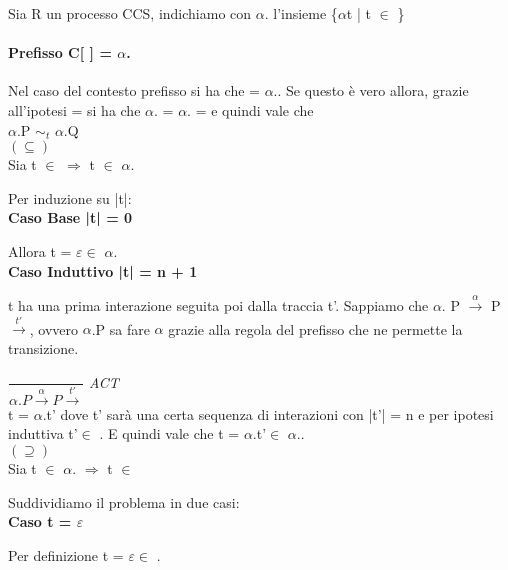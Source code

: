 Sia R un processo CCS, indichiamo con $\alpha$. l'insieme \{$\alpha$t | t $\in$ \}

\paragraph{Prefisso C[ ] = $\alpha$.} \mbox{}

Nel caso del contesto prefisso si ha che  = $\alpha$..
Se questo è vero allora, grazie all'ipotesi  =  si ha che  $\alpha$. =  $\alpha$. =  e quindi vale che\\ $\alpha$.P $\sim_{t}$ $\alpha$.Q\\

$(\subseteq)$ \\

Sia  t $\in$  $\Rightarrow$  t $\in$ $\alpha$.

Per induzione su |t|:
\\

\textbf{Caso Base |t| = 0}

Allora t = $\varepsilon \in$ $ \alpha$.
\\

\textbf{Caso Induttivo |t| = n + 1}

t ha una prima interazione seguita poi dalla traccia t'. Sappiamo che $\alpha.$ P $\overset{\alpha}\rightarrow $ P $\overset{t'}\rightarrow$, ovvero $\alpha$.P sa fare $\alpha$ grazie alla regola del prefisso che ne permette la transizione.

	$\dfrac{}{\alpha.P \overset{\alpha}\rightarrow P\overset{t'}\rightarrow}$ \textit{ACT} \\
	
t = $\alpha$.t' dove t' sarà una certa sequenza di interazioni con |t'| = n e per ipotesi induttiva t'$\in$ . E quindi vale che t = $\alpha$.t'$\in$ $\alpha$..\\

$(\supseteq)$ \\

Sia  t $\in$ $\alpha$. $\Rightarrow$  t $\in$ 

Suddividiamo il problema in due casi:
\\

\textbf{Caso t = $\varepsilon$}

Per definizione t = $\varepsilon \in $ .
\\
 
